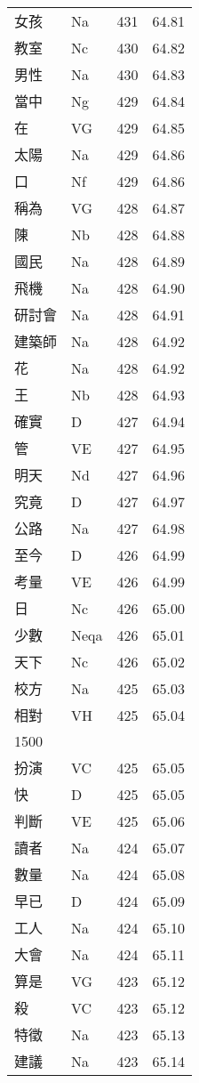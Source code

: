 \documentclass[twocolumn]{book}
\begin{document}
\begin{supertabular}{llrr}
女孩 & Na & 431 &  64.81\\
教室 & Nc & 430 &  64.82\\
男性 & Na & 430 &  64.83\\
當中 & Ng & 429 &  64.84\\
在 & VG & 429 &  64.85\\
太陽 & Na & 429 &  64.86\\
口 & Nf & 429 &  64.86\\
稱為 & VG & 428 &  64.87\\
陳 & Nb & 428 &  64.88\\
國民 & Na & 428 &  64.89\\
飛機 & Na & 428 &  64.90\\
研討會 & Na & 428 &  64.91\\
建築師 & Na & 428 &  64.92\\
花 & Na & 428 &  64.92\\
王 & Nb & 428 &  64.93\\
確實 & D & 427 &  64.94\\
管 & VE & 427 &  64.95\\
明天 & Nd & 427 &  64.96\\
究竟 & D & 427 &  64.97\\
公路 & Na & 427 &  64.98\\
至今 & D & 426 &  64.99\\
考量 & VE & 426 &  64.99\\
日 & Nc & 426 &  65.00\\
少數 & Neqa & 426 &  65.01\\
天下 & Nc & 426 &  65.02\\
校方 & Na & 425 &  65.03\\
相對 & VH & 425 &  65.04\\
1500\\
扮演 & VC & 425 &  65.05\\
快 & D & 425 &  65.05\\
判斷 & VE & 425 &  65.06\\
讀者 & Na & 424 &  65.07\\
數量 & Na & 424 &  65.08\\
早已 & D & 424 &  65.09\\
工人 & Na & 424 &  65.10\\
大會 & Na & 424 &  65.11\\
算是 & VG & 423 &  65.12\\
殺 & VC & 423 &  65.12\\
特徵 & Na & 423 &  65.13\\
建議 & Na & 423 &  65.14\\

\end{supertabular}
\end{document}
